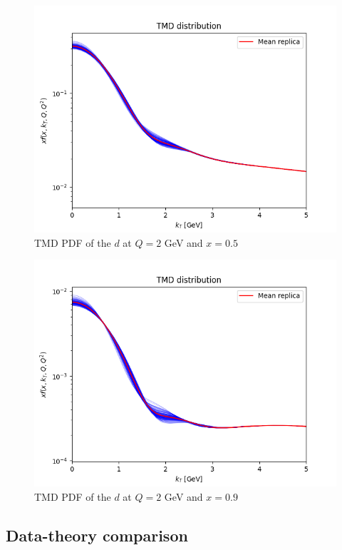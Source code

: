 \documentclass[
]{article}
\begin{document}
\begin{figure}
\centering
\includegraphics{pngplots/tmd_1_2_0.5.png}
\caption{TMD PDF of the \(d\) at \(Q = 2\) GeV and \(x = 0.5\)}
\end{figure}

\begin{figure}
\centering
\includegraphics{pngplots/tmd_1_2_0.9.png}
\caption{TMD PDF of the \(d\) at \(Q = 2\) GeV and \(x = 0.9\)}
\end{figure}

\hypertarget{data-theory-comparison}{%
\subsection{Data-theory comparison}\label{data-theory-comparison}}
\end{document}
